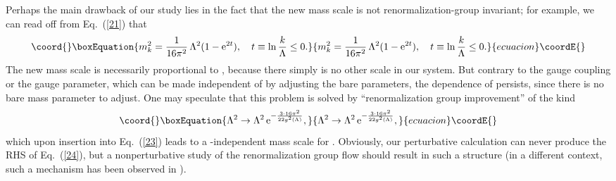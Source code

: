 \documentclass[a4paper,12pt]{article}
\providecommand{\E}{\text{e}}
\providecommand{\re}[1]{~(\ref{#1})}\usepackage{useful_macros}
\begin{document}
Perhaps the main drawback of our study lies in the fact that the
new mass scale is not renormalization-group invariant; for example, we
can read off from Eq.\re{21} that
\begin{equation}\coord{}\boxEquation{
m_k^2=\frac{1}{16\pi^2}\, \Lambda^2 (1-\E^{2t}), \quad
t\equiv \ln \frac{k}{\Lambda}\leq0. \label{23}
}{
m_k^2=\frac{1}{16\pi^2}\, \Lambda^2 (1-\E^{2t}), \quad
t\equiv \ln \frac{k}{\Lambda}\leq0. }{ecuacion}\coordE{}\end{equation}
The new mass scale \coordHE{} is necessarily proportional to \myHighlight{$\Lambda$}\coordHE{},
because there simply is no other scale in our system. But contrary to
the gauge coupling or the gauge parameter, which can be made
independent of \myHighlight{$\Lambda$}\coordHE{} by adjusting the bare parameters, the
\myHighlight{$\Lambda$}\coordHE{} dependence of \coordHE{} persists, since there is no bare mass
parameter to adjust. One may speculate that this problem is solved by
``renormalization group improvement'' of the kind
\begin{equation}\coord{}\boxEquation{
\Lambda^2\to \Lambda^2\, \E^{-\frac{3\cdot 16\pi^2}{22 g^2(\Lambda)}},
\label{24}
}{
\Lambda^2\to \Lambda^2\, \E^{-\frac{3\cdot 16\pi^2}{22 g^2(\Lambda)}},
}{ecuacion}\coordE{}\end{equation}
which upon insertion into Eq.\re{23} leads to a \myHighlight{$\Lambda$}\coordHE{}-independent
mass scale for \coordHE{}. Obviously, our perturbative calculation can
never produce the RHS of Eq.\re{24}, but a nonperturbative study of
the renormalization group flow should result in such a structure (in a
different context, such a mechanism has been observed in 
\cite{Ellwanger:1998wv}).
\end{document}
